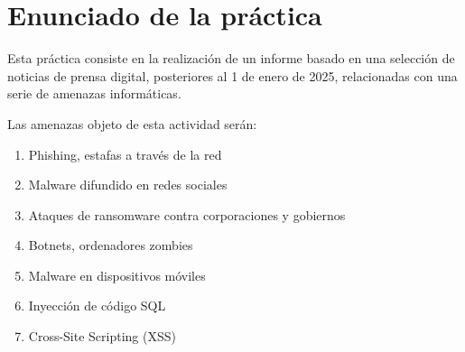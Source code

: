 \section{Enunciado de la práctica}
Esta práctica consiste en la realización de un informe basado en una selección de noticias de prensa digital, posteriores al 1 de enero de 2025, relacionadas con una serie de amenazas informáticas.

Las amenazas objeto de esta actividad serán:
\begin{enumerate}
    \item Phishing, estafas a través de la red
    \item Malware difundido en redes sociales
    \item Ataques de ransomware contra corporaciones y gobiernos
    \item Botnets, ordenadores zombies
    \item Malware en dispositivos móviles
    \item Inyección de código SQL
    \item Cross-Site Scripting (XSS)
\end{enumerate}

